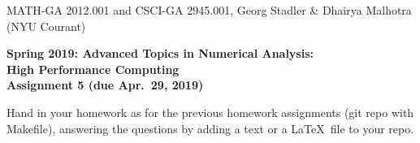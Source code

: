 \documentclass[12pt]{article}
\begin{document}
\begin{center}
  \vspace*{-2cm}
{\small MATH-GA 2012.001 and CSCI-GA 2945.001, Georg Stadler \&
  Dhairya Malhotra (NYU Courant)}
\end{center}
\vspace*{.5cm}
\begin{center}
\large \textbf{%
Spring 2019: Advanced Topics in Numerical Analysis: \\
High Performance Computing \\
Assignment 5 (due Apr.\ 29, 2019) }
\end{center}

 Hand in your homework as for
the previous homework assignments (git repo with Makefile), answering
the questions by adding a text or a \LaTeX\ file to your repo.
\\[.2ex]
\end{document}
